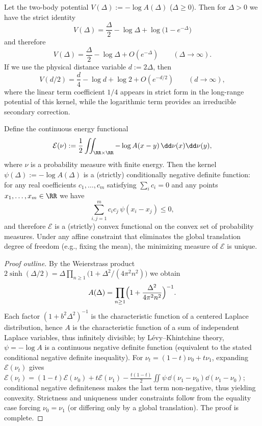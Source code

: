 \begin{remark}\label{rem:xi-hellinger-two-body-potential-area-log}
Let the two-body potential \(V(\Delta):=-\log A(\Delta)\) (\(\Delta\ge 0\)).
Then for \(\Delta>0\) we have the strict identity
\[
\boxed{\;
V(\Delta)=\frac{\Delta}{2}-\log\Delta+\log\bigl(1-e^{-\Delta}\bigr)\;}
\]
and therefore
\[
V(\Delta)=\frac{\Delta}{2}-\log\Delta+O(e^{-\Delta})\qquad(\Delta\to\infty).
\]
If we use the physical distance variable \(d:=2\Delta\), then
\[
V(d/2)=\frac{d}{4}-\log d+\log 2+O(e^{-d/2})\qquad(d\to\infty),
\]
where the linear term coefficient \(1/4\) appears in strict form in the long-range potential of this kernel, while the logarithmic term provides an irreducible secondary correction.
\end{remark}

\begin{proposition}\label{prop:xi-hellinger-energy-functional-strict-convexity}
Define the continuous energy functional
\[
\mathcal E(\nu):=\frac12\iint_{\RR\times\RR} -\log A(x-y)\,\dd\nu(x)\dd\nu(y),
\]
where \(\nu\) is a probability measure with finite energy.
Then the kernel \(\psi(\Delta):=-\log A(\Delta)\) is a (strictly) conditionally negative definite function: for any real coefficients \(c_1,\dots,c_m\) satisfying \(\sum_i c_i=0\) and any points \(x_1,\dots,x_m\in\RR\) we have
\[
\sum_{i,j=1}^{m}c_ic_j\,\psi(x_i-x_j)\le 0,
\]
and therefore \(\mathcal E\) is a (strictly) convex functional on the convex set of probability measures.
Under any affine constraint that eliminates the global translation degree of freedom (e.g., fixing the mean), the minimizing measure of \(\mathcal E\) is unique.
\end{proposition}
\begin{proof}[Proof outline]
By the Weierstrass product
\(
2\sinh(\Delta/2)=\Delta\prod_{n\ge 1}\bigl(1+\Delta^2/(4\pi^2n^2)\bigr)
\)
we obtain
\[
A(\Delta)=\prod_{n\ge 1}\Bigl(1+\frac{\Delta^2}{4\pi^2n^2}\Bigr)^{-1}.
\]
Each factor \((1+b^2\Delta^2)^{-1}\) is the characteristic function of a centered Laplace distribution, hence \(A\) is the characteristic function of a sum of independent Laplace variables, thus infinitely divisible; by L\'evy--Khintchine theory, \(\psi=-\log A\) is a continuous negative definite function (equivalent to the stated conditional negative definite inequality).
For \(\nu_t=(1-t)\nu_0+t\nu_1\), expanding \(\mathcal E(\nu_t)\) gives
\(
\mathcal E(\nu_t)=(1-t)\mathcal E(\nu_0)+t\mathcal E(\nu_1)-\frac{t(1-t)}{2}\iint \psi\,\dd(\nu_1-\nu_0)\dd(\nu_1-\nu_0)
\);
conditional negative definiteness makes the last term non-negative, thus yielding convexity. Strictness and uniqueness under constraints follow from the equality case forcing \(\nu_0=\nu_1\) (or differing only by a global translation). The proof is complete.
\end{proof}

